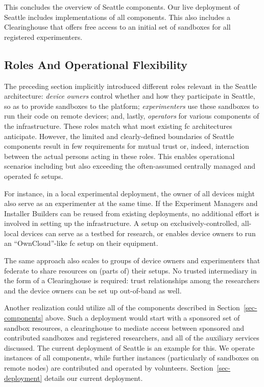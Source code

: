 This concludes the overview of Seattle components. Our live deployment
of Seattle includes implementations of all components.
This also includes a
Clearinghouse that offers free access to an initial set of sandboxes
for all registered experimenters.




\subsection{Roles And Operational Flexibility}\label{sec-op-flex}

The preceding section implicitly introduced different roles relevant
in the Seattle architecture:
\textit{device owners} control whether and how they participate
in Seattle, so as to provide sandboxes to the platform;
\textit{experimenters} use these sandboxes to run their code
on remote devices;
and, lastly, \textit{operators} for various components
of the infrastructure.
These roles match what most existing \gls{fc} architectures
anticipate.
However, the limited and clearly-defined boundaries of Seattle
components result in few requirements for mutual trust or, indeed,
interaction between
the actual persons acting in these roles. This enables operational
scenarios including but also exceeding the often-assumed centrally managed
and operated \gls{fc} setups.

For instance, in a local experimental deployment, the owner of all
devices might also serve as an experimenter at the same time. If
the Experiment Managers and Installer Builders can be reused
from existing deployments, no additional effort is involved in
setting up the infrastructure.
A setup on exclusively-controlled, all-local devices can serve as
a testbed for research, or enables device owners to run an
``OwnCloud''-like \gls{fc} setup on their equipment.

The same approach also scales to groups of device owners and experimenters
that federate
to share resources on (parts of) their setups. No trusted
intermediary in the form of a Clearinghouse is required:
trust relationships among the researchers and the device owners
can be set up out-of-band as well.

Another realization could utilize all of the components described
in Section~\ref{sec-components} above.
Such a deployment would start with a sponsored set of sandbox resources,
a clearinghouse to mediate access between sponsored and contributed
sandboxes
and registered researchers, and all of the auxiliary services
discussed. The current deployment of Seattle is an example for
this. We operate instances of all components, while further instances
(particularly of sandboxes on remote nodes) are contributed and
operated by volunteers.
Section~\ref{sec-deployment} details our current deployment.

